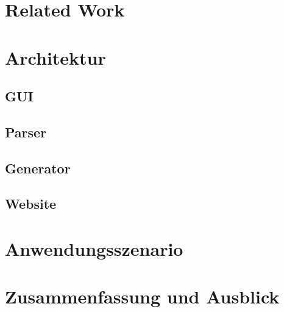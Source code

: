 \documentclass[a4paper,12pt,headsepline]{scrartcl}
\begin{document}
\section{Related Work}

\newpage

\section{Architektur}

\subsection{GUI}

\newpage

\subsection{Parser}

\newpage

\subsection{Generator}

\newpage

\subsection{Website}

\newpage

\section{Anwendungsszenario}

\section{Zusammenfassung und Ausblick}

\onecolumn
\singlespacing
\newpage
{}
\renewcommand\refname{Literaturverzeichnis}

\end{document}
